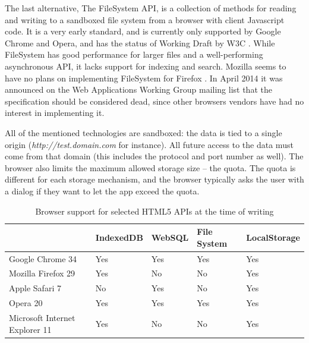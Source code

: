 The last alternative, The FileSystem API, is a collection of methods for reading and writing to a sandboxed file system from a browser with client Javascript code. It is a very early standard, and is currently only supported by Google Chrome and Opera, and has the status of Working Draft by W3C \cite{FileSystem:Online}. While FileSystem has good performance for larger files and a well-performing asynchronous API, it lacks support for indexing and search. Mozilla seems to have no plans on implementing FileSystem for Firefox \cite{MozillaFileSystem:Online}. In April 2014 it was announced on the Web Applications Working Group mailing list that the specification should be considered dead, since other browsers vendors have had no interest in implementing it\cite{FileSystemMailingList:Online}.

All of the mentioned technologies are sandboxed: the data is tied to a single origin (\emph{http://test.domain.com} for instance). All future access to the data must come from that domain (this includes the protocol and port number as well). The browser also limits the maximum allowed storage size – the quota. The quota is different for each storage mechanism, and the browser typically asks the user with a dialog if they want to let the app exceed the quota.

\begin{table}
    \begin{tabular}{|l|l|l|l|l|}
    \hline
                       & IndexedDB & WebSQL & File System & LocalStorage \\ \hline
    Google Chrome 34               & Yes       & Yes    & Yes  & Yes                      \\ \hline
    Mozilla Firefox 29             & Yes       & \cellcolor{red}No  & \cellcolor{red}No   & Yes                        \\ \hline
    Apple Safari 7                & \cellcolor{red}No        & Yes  & \cellcolor{red}No    & Yes                        \\ \hline
    Opera 20                       & Yes       & Yes    & Yes  & Yes                      \\ \hline
    Microsoft Internet Explorer 11 & Yes       & \cellcolor{red}No  & \cellcolor{red}No   & Yes                        \\ \hline
    \end{tabular}
    \caption {Browser support for selected HTML5 APIs at the time of writing}
\end{table}


